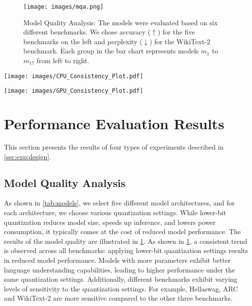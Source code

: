 \begin{figure}[!hbp]
    \centering 
    \texttt{[image: images/mqa.png]}  
 \caption{Model Quality Analysis: The models were evaluated based on six different benchmarks. We chose accuracy (\textbf{$\uparrow$}) for the five benchmarks on the left and perplexity (\textbf{$\downarrow$}) for the WikiText-2 benchmark.  Each group in the bar chart represents models $m_1$ to $m_{17}$ from left to right.}
    \label{fig:Modelsqty}
\end{figure}  

\begin{figure*}[!htbp]
    \centering 
    \vskip -0.1cm   
      \texttt{[image: images/CPU\_Consistency\_Plot.pdf]}  
    \vskip -0.2478cm
    \label{fig:StabDD}
\caption{}
    \label{fig:StabDD}
\end{figure*}
\begin{figure*}[!htbp] 
 \vskip -0.145cm 
     \centering  
     \texttt{[image: images/GPU\_Consistency\_Plot.pdf]}  
\vskip -0.245cm 
    \caption{}
    \label{fig:VPGPU}
\end{figure*}

\section{Performance Evaluation Results}
\label{sec:results}%
This section presents the results of four types of experiments described in \cref{sec:exp:design}.
\subsection{Model Quality Analysis}
As shown in \cref{tab:models}, we select five different model architectures, and for each architecture, we choose various quantization settings. While lower-bit quantization reduces model size, speeds up inference, and lowers power consumption, it typically comes at the cost of reduced model performance. The results of the model quality are illustrated in \cref{fig:Modelsqty}.
\label{sec:resModelsQty}
As shown in \cref{fig:Modelsqty}, a consistent trend is observed across all benchmarks: applying lower-bit quantization settings results in reduced model performance. Models with more parameters exhibit better language understanding capabilities, leading to higher performance under the same quantization settings. Additionally, different benchmarks exhibit varying levels of sensitivity to the quantization settings. For example, Hellaswag, ARC and WikiText-2 are more sensitive compared to the other three benchmarks.

